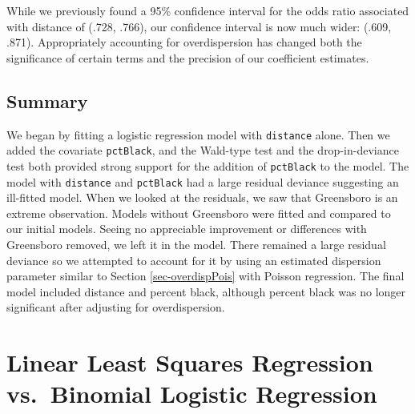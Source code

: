 \documentclass[
]{krantz}
\begin{document}
While we previously found a 95\% confidence interval for the odds ratio associated with distance of (.728, .766), our confidence interval is now much wider: (.609, .871). Appropriately accounting for overdispersion has changed both the significance of certain terms and the precision of our coefficient estimates.

\hypertarget{summary-1}{%
\subsection{Summary}\label{summary-1}}

We began by fitting a logistic regression model with \texttt{distance} alone. Then we added the covariate \texttt{pctBlack}, and the Wald-type test and the drop-in-deviance test both provided strong support for the addition of \texttt{pctBlack} to the model. The model with \texttt{distance} and \texttt{pctBlack} had a large residual deviance suggesting an ill-fitted model. When we looked at the residuals, we saw that Greensboro is an extreme observation. Models without Greensboro were fitted and compared to our initial models. Seeing no appreciable improvement or differences with Greensboro removed, we left it in the model. There remained a large residual deviance so we attempted to account for it by using an estimated dispersion parameter similar to Section \ref{sec-overdispPois} with Poisson regression. The final model included distance and percent black, although percent black was no longer significant after adjusting for overdispersion.

\hypertarget{linear-least-squares-regression-vs.-binomial-logistic-regression}{%
\section{\texorpdfstring{Linear Least Squares Regression  vs.~Binomial Logistic Regression }{Linear Least Squares Regression  vs.~Binomial Logistic Regression }}\label{linear-least-squares-regression-vs.-binomial-logistic-regression}}
\end{document}
